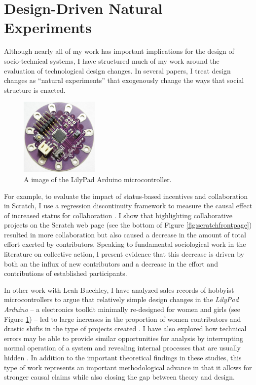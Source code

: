\documentclass[10pt]{memoir}
\begin{document}
\section{Design-Driven Natural Experiments}

Although nearly all of my work has important implications for the
design of socio-technical systems, I have structured much of my work
around the evaluation of technological design changes. In several
papers, I treat design changes as ``natural experiments'' that
exogenously change the ways that social structure is enacted.

\begin{figure}
 \vspace{-1em}
 \begin{centering}
 \includegraphics[width=1.5in]{figures/lilypad.jpg}
 \caption{A image of the LilyPad Arduino microcontroller.}
 \label{fig:lilypad}
 \end{centering}
 \vspace{-1em}
\end{figure}

For example, to evaluate the impact of status-based incentives and
collaboration in Scratch, I use a regression discontinuity framework
to measure the causal effect of increased status for collaboration
\cite{hill_causal_2012}. I show that highlighting collaborative
projects on the Scratch web page (see the bottom of Figure
\ref{fig:scratchfrontpage}) resulted in more collaboration but also
caused a decrease in the amount of total effort exerted by
contributors. Speaking to fundamental sociological work in the
literature on collective action, I present evidence that this decrease
is driven by both an the influx of new contributors and a decrease in
the effort and contributions of established participants.

In other work with Leah Buechley, I have analyzed sales records of
hobbyist microcontrollers to argue that relatively simple design
changes in the \emph{LilyPad Arduino} -- a electronics toolkit
minimally re-designed for women and girls (see Figure
\ref{fig:lilypad}) -- led to large increases in the proportion of
women contributors and drastic shifts in the type of projects created
\cite{buechley_lilypad_2010}. I have also explored how technical
errors may be able to provide similar opportunities for analysis by
interrupting normal operation of a system and revealing internal
processes that are usually hidden \cite{hill_revealing_2010}. In
addition to the important theoretical findings in these studies, this
type of work represents an important methodological advance in that it
allows for stronger causal claims while also closing the gap between
theory and design.
\end{document}
